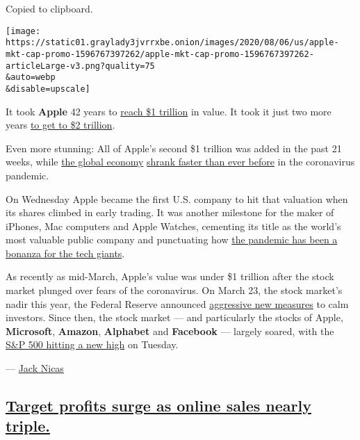 Copied to clipboard.

\texttt{[image: https://static01.graylady3jvrrxbe.onion/images/2020/08/06/us/apple-mkt-cap-promo-1596767397262/apple-mkt-cap-promo-1596767397262-articleLarge-v3.png?quality=75\\\&auto=webp\\\&disable=upscale]}

It took \textbf{Apple} 42 years to
\href{https://www.nytimes3xbfgragh.onion/2018/08/02/technology/apple-stock-1-trillion-market-cap.html}{reach
\$1 trillion} in value. It took it just two more years
\href{https://www.nytimes3xbfgragh.onion/2020/08/19/technology/apple-2-trillion.html}{to
get to \$2 trillion}.

Even more stunning: All of Apple's second \$1 trillion was added in the
past 21 weeks, while
\href{https://www.nytimes3xbfgragh.onion/live/2020/07/31/business/stock-market-today-coronavirus/europes-contraction-is-its-worst-on-record}{the
global economy}
\href{https://www.nytimes3xbfgragh.onion/2020/07/30/business/economy/q2-gdp-coronavirus-economy.html}{shrank
faster than ever before} in the coronavirus pandemic.

On Wednesday Apple became the first U.S. company to hit that valuation
when its shares climbed in early trading. It was another milestone for
the maker of iPhones, Mac computers and Apple Watches, cementing its
title as the world's most valuable public company and punctuating how
\href{https://www.nytimes3xbfgragh.onion/2020/03/23/technology/coronavirus-facebook-amazon-youtube.html}{the
pandemic has been a bonanza for the tech giants}.

As recently as mid-March, Apple's value was under \$1 trillion after the
stock market plunged over fears of the coronavirus. On March 23, the
stock market's nadir this year, the Federal Reserve announced
\href{https://www.nytimes3xbfgragh.onion/2020/03/23/business/economy/coronavirus-fed-bond-buying.html}{aggressive
new measures} to calm investors. Since then, the stock market --- and
particularly the stocks of Apple, \textbf{Microsoft}, \textbf{Amazon},
\textbf{Alphabet} and \textbf{Facebook} --- largely soared, with the
\href{https://www.nytimes3xbfgragh.onion/2020/08/18/business/stock-market-record.html}{S\&P
500 hitting a new high} on Tuesday.

--- \href{https://www.nytimes3xbfgragh.onion/by/jack-nicas}{Jack Nicas}

\hypertarget{target-profits-surge-as-online-sales-nearly-triple}{%
\subsection{\texorpdfstring{\protect\hyperlink{target-profits-surge-as-online-sales-nearly-triple}{Target
profits surge as online sales nearly
triple.}}{Target profits surge as online sales nearly triple.}}\label{target-profits-surge-as-online-sales-nearly-triple}}

